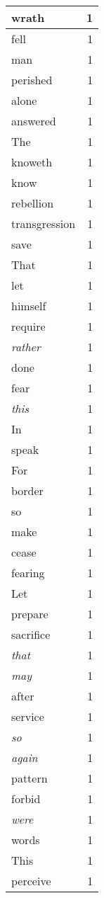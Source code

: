 \begin{center}
\begin{longtable}{l|r}
wrath & 1\\ \hline 
fell & 1\\ \hline 
man & 1\\ \hline 
perished & 1\\ \hline 
alone & 1\\ \hline 
answered & 1\\ \hline 
The & 1\\ \hline 
knoweth & 1\\ \hline 
know & 1\\ \hline 
rebellion & 1\\ \hline 
transgression & 1\\ \hline 
save & 1\\ \hline 
That & 1\\ \hline 
let & 1\\ \hline 
himself & 1\\ \hline 
require & 1\\ \hline 
\emph{rather} & 1\\ \hline 
done & 1\\ \hline 
fear & 1\\ \hline 
\emph{this} & 1\\ \hline 
In & 1\\ \hline 
speak & 1\\ \hline 
For & 1\\ \hline 
border & 1\\ \hline 
so & 1\\ \hline 
make & 1\\ \hline 
cease & 1\\ \hline 
fearing & 1\\ \hline 
Let & 1\\ \hline 
prepare & 1\\ \hline 
sacrifice & 1\\ \hline 
\emph{that} & 1\\ \hline 
\emph{may} & 1\\ \hline 
after & 1\\ \hline 
service & 1\\ \hline 
\emph{so} & 1\\ \hline 
\emph{again} & 1\\ \hline 
pattern & 1\\ \hline 
forbid & 1\\ \hline 
\emph{were} & 1\\ \hline 
words & 1\\ \hline 
This & 1\\ \hline 
perceive & 1\\ \hline 

\end{longtable}
\end{center}
